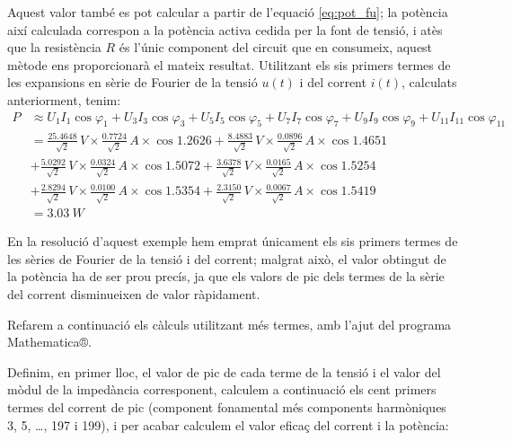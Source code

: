 \begin{exemple}
    Aquest valor també es pot calcular a partir de l'equació
    \eqref{eq:pot_fu}; la potència així calculada correspon a la
    potència activa cedida per la font de tensió, i atès que la
    resistència $R$ és l'únic component del circuit que en consumeix,
    aquest mètode ens proporcionarà el mateix resultat. Utilitzant els sis primers termes  de les
    expansions en sèrie de Fourier de la tensió $u(t)$ i del corrent
    $i(t)$, calculats anteriorment, tenim:
    \[\begin{split}
        P &\approx U_1 I_1 \cos\varphi_1 +  U_3 I_3 \cos\varphi_3 +
         U_5 I_5 \cos\varphi_5 + U_7 I_7 \cos\varphi_7 +
         U_9 I_9 \cos\varphi_9 + U_{11} I_{11} \cos\varphi_{11} \\[0.7ex]
        &= \frac{\num{25,4648}}{\sqrt{2}}\unit{\,V} \times
        \frac{\num{0,7724}}{\sqrt{2}}\unit{\,A} \times \cos \num{1,2626} +
        \frac{\num{8,4883}}{\sqrt{2}}\unit{\,V} \times
        \frac{\num{0,0896}}{\sqrt{2}}\unit{\,A} \times \cos \num{1,4651}  \\[0.7ex]
        &+ \frac{\num{5,0292}}{\sqrt{2}}\unit{\,V} \times
        \frac{\num{0,0324}}{\sqrt{2}}\unit{\,A} \times \cos \num{1,5072} +
        \frac{\num{3,6378}}{\sqrt{2}}\unit{\,V} \times
        \frac{\num{0,0165}}{\sqrt{2}}\unit{\,A} \times \cos \num{1,5254} \\[0.7ex]
        &+ \frac{\num{2,8294}}{\sqrt{2}}\unit{\,V} \times
        \frac{\num{0,0100}}{\sqrt{2}}\unit{\,A} \times \cos \num{1,5354} +
        \frac{\num{2,3150}}{\sqrt{2}}\unit{\,V} \times
        \frac{\num{0,0067}}{\sqrt{2}}\unit{\,A} \times \cos \num{1,5419}\\[0.7ex]
        &= \qty{3,03}{W}
    \end{split}\]

    En la resolució d'aquest exemple hem emprat únicament els sis
    primers termes de les sèries de Fourier de la tensió i del corrent;
    malgrat això, el valor  obtingut de la potència ha de ser prou precís, ja que
    els valors de pic dels termes de la sèrie del corrent disminueixen de
    valor ràpidament.

    Refarem a continuació els càlculs utilitzant més termes, amb l'ajut
    del programa
    Mathematica®.   

    Definim, en primer lloc, el valor de pic de cada
     terme de la tensió i el valor del mòdul de la impedància corresponent,
    calculem a continuació els cent primers termes  del corrent de pic (component fonamental més components harmòniques 3, 5, \ldots, 197 i 199), i
    per acabar calculem el valor eficaç del corrent i la potència:


\end{exemple}
